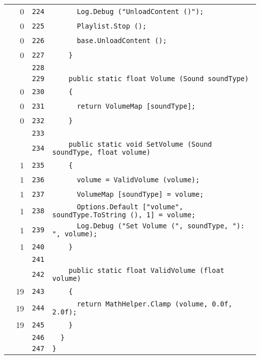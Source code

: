 \documentclass[a4paper,10pt]{article}
\begin{document}
\begin{longtable}[l]{lrrl}
\cellcolor{red} & 0 & \verb~224~ & \verb~      Log.Debug ("UnloadContent ()");~\\
\cellcolor{red} & 0 & \verb~225~ & \verb~      Playlist.Stop ();~\\
\cellcolor{red} & 0 & \verb~226~ & \verb~      base.UnloadContent ();~\\
\cellcolor{red} & 0 & \verb~227~ & \verb~    }~\\
\cellcolor{gray} &  & \verb~228~ & \verb~~\\
\cellcolor{gray} &  & \verb~229~ & \verb~    public static float Volume (Sound soundType)~\\
\cellcolor{red} & 0 & \verb~230~ & \verb~    {~\\
\cellcolor{red} & 0 & \verb~231~ & \verb~      return VolumeMap [soundType];~\\
\cellcolor{red} & 0 & \verb~232~ & \verb~    }~\\
\cellcolor{gray} &  & \verb~233~ & \verb~~\\
\cellcolor{gray} &  & \verb~234~ & \verb~    public static void SetVolume (Sound soundType, float volume)~\\
\cellcolor{green} & 1 & \verb~235~ & \verb~    {~\\
\cellcolor{green} & 1 & \verb~236~ & \verb~      volume = ValidVolume (volume);~\\
\cellcolor{green} & 1 & \verb~237~ & \verb~      VolumeMap [soundType] = volume;~\\
\cellcolor{green} & 1 & \verb~238~ & \verb~      Options.Default ["volume", soundType.ToString (), 1] = volume;~\\
\cellcolor{green} & 1 & \verb~239~ & \verb~      Log.Debug ("Set Volume (", soundType, "): ", volume);~\\
\cellcolor{green} & 1 & \verb~240~ & \verb~    }~\\
\cellcolor{gray} &  & \verb~241~ & \verb~~\\
\cellcolor{gray} &  & \verb~242~ & \verb~    public static float ValidVolume (float volume)~\\
\cellcolor{green} & 19 & \verb~243~ & \verb~    {~\\
\cellcolor{green} & 19 & \verb~244~ & \verb~      return MathHelper.Clamp (volume, 0.0f, 2.0f);~\\
\cellcolor{green} & 19 & \verb~245~ & \verb~    }~\\
\cellcolor{gray} &  & \verb~246~ & \verb~  }~\\
\cellcolor{gray} &  & \verb~247~ & \verb~}~\\
\end{longtable}
\newpage
\end{document}
